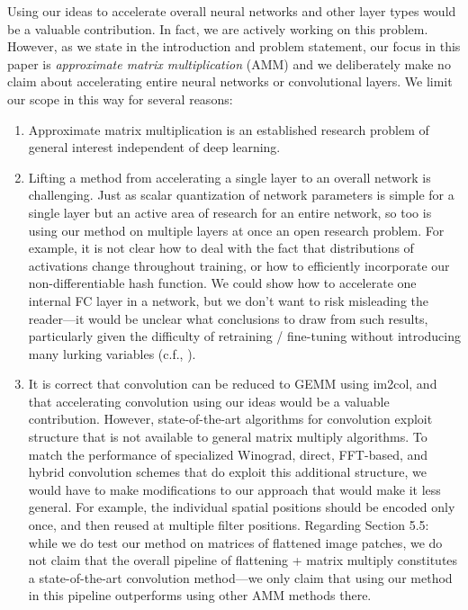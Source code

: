 Using our ideas to accelerate overall neural networks and other layer types would be a valuable contribution. In fact, we are actively working on this problem. However, as we state in the introduction and problem statement, our focus in this paper is \textit{approximate matrix multiplication} (AMM) and we deliberately make no claim about accelerating entire neural networks or convolutional layers. We limit our scope in this way for several reasons:
\begin{enumerate}
\item Approximate matrix multiplication is an established research problem of general interest independent of deep learning.
\item Lifting a method from accelerating a single layer to an overall network is challenging. Just as scalar quantization of network parameters is simple for a single layer but an active area of research for an entire network, so too is using our method on multiple layers at once an open research problem. For example, it is not clear how to deal with the fact that distributions of activations change throughout training, or how to efficiently incorporate our non-differentiable hash function.
We could show how to accelerate one internal FC layer in a network, but we don’t want to risk misleading the reader---it would be unclear what conclusions to draw from such results, particularly given the difficulty of retraining / fine-tuning without introducing many lurking variables (c.f., \cite{blalock2020}).
\item It is correct that convolution can be reduced to GEMM using im2col, and that accelerating convolution using our ideas would be a valuable contribution. However, state-of-the-art algorithms for convolution exploit structure that is not available to general matrix multiply algorithms. To match the performance of specialized Winograd, direct, FFT-based, and hybrid convolution schemes that do exploit this additional structure, we would have to make modifications to our approach that would make it less general. For example, the individual spatial positions should be encoded only once, and then reused at multiple filter positions. Regarding Section 5.5: while we do test our method on matrices of flattened image patches, we do not claim that the overall pipeline of flattening + matrix multiply constitutes a state-of-the-art convolution method---we only claim that using our method in this pipeline outperforms using other AMM methods there.
\end{enumerate}

